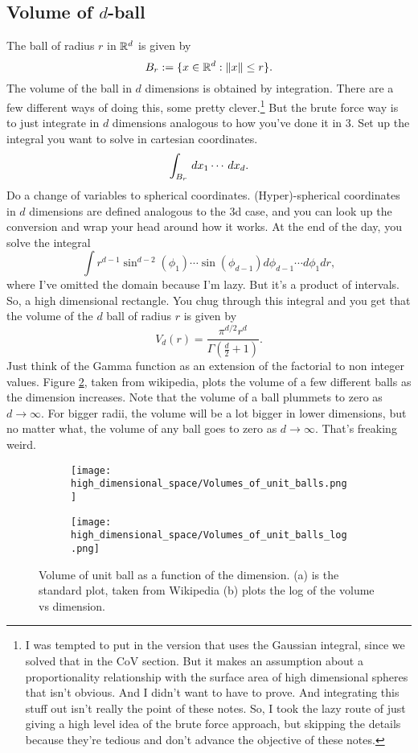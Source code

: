 \subsection{Volume of $d$-ball}
The ball of radius $r$ in $\mathbb{R}^d$ is given by
$$
B_r := \{ x\in \mathbb{R}^d: \|x\| \leq r\}.
$$
The volume of the ball in $d$ dimensions is obtained by integration. There are a few different ways of doing this, some pretty clever.\footnote{I was tempted to put in the version that uses the Gaussian integral, since we solved that in the CoV section. But it makes an assumption about a proportionality relationship with the surface area of high dimensional spheres that isn't obvious. And I didn't want to have to prove. And integrating this stuff out isn't really the point of these notes. So, I took the lazy route of just giving a high level idea of the brute force approach, but skipping the details because they're tedious and don't advance the objective of these notes.} But the brute force way is to just integrate in $d$ dimensions analogous to how you've done it in 3. Set up the integral you want to solve in cartesian coordinates.
$$
\int_{B_r} \, dx_1\cdots \, dx_d.
$$
Do a change of variables to spherical coordinates. (Hyper)-spherical coordinates in $d$ dimensions are defined analogous to the 3d case, and you can look up the conversion and wrap your head around how it works. At the end of the day, you solve the integral
$$
\int r^{d-1} \sin^{d-2}(\phi_1)\cdots\sin(\phi_{d-1}) d\phi_{d-1}\cdots d\phi_{1} dr,
$$
where I've omitted the domain because I'm lazy. But it's a product of intervals. So, a high dimensional rectangle. You chug through this integral and you get that the volume of the $d$ ball of radius $r$ is given by
\begin{equation} \label{eq:vol-of-ball}
V_d(r) = \frac{\pi^{d/2}r^d}{\Gamma(\frac{d}{2} + 1)}. 
\end{equation}
Just think of the Gamma function as an extension of the factorial to non integer values. 
Figure \ref{fig:volumes-of-balls}, taken from wikipedia, plots the volume of a few different balls as the dimension increases. Note that the volume of a ball plummets to zero as $d\to\infty$. For bigger radii, the volume will be a lot bigger in lower dimensions, but no matter what, the volume of any ball goes to zero as $d\to \infty$. That's freaking weird. 
\begin{figure}[h]
     \centering
     \begin{subfigure}[b]{0.4\textwidth}
         \centering
         \texttt{[image: high\_dimensional\_space/Volumes\_of\_unit\_balls.png]}
         \caption{}
     \end{subfigure}
     \begin{subfigure}[b]{0.4\textwidth}
         \centering
         \texttt{[image: high\_dimensional\_space/Volumes\_of\_unit\_balls\_log.png]}
         \caption{}
         \label{fig:three sin x}
     \end{subfigure}
        \caption{Volume of unit ball as a function of the dimension. (a) is the standard plot, taken from Wikipedia (b) plots the log of the volume vs dimension.}
        \label{fig:volumes-of-balls}
\end{figure}


